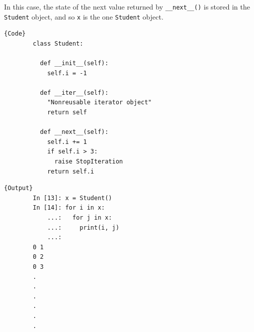   \begin{theorem}
    \label{thm:one-class-as-iterator-and-iterable}
    In this case, the state of the next value returned by \texttt{\_\_next\_\_()} is stored in the \texttt{Student} object, and so \texttt{x} is the one \texttt{Student} object. 

    \noindent\begin{minipage}{.5\textwidth}
      \begin{lstlisting}[]{Code}
        class Student: 

          def __init__(self): 
            self.i = -1

          def __iter__(self): 
            "Nonreusable iterator object"
            return self 

          def __next__(self): 
            self.i += 1  
            if self.i > 3: 
              raise StopIteration
            return self.i
      \end{lstlisting}
      \end{minipage}
      \hfill
      \begin{minipage}{.49\textwidth}
      \begin{lstlisting}[]{Output}
        In [13]: x = Student()
        In [14]: for i in x:
            ...:   for j in x:
            ...:     print(i, j)
            ...: 
        0 1
        0 2
        0 3
        .
        .
        .
        .
        .
        .
      \end{lstlisting}
    \end{minipage}
  \end{theorem}

